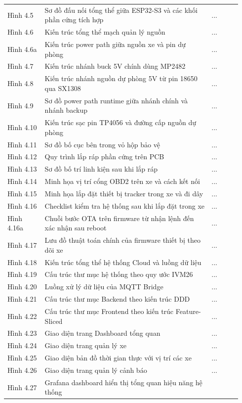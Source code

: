 \documentclass[13pt,a4paper]{extarticle}
\newcommand{\thesislongtableorignewline}{}
\let\thesislongtableorignewline\\
\renewcommand{\\}{\thesislongtableorignewline\hline}%
\let\\\thesislongtableorignewline
\begin{document}
{\begin{longtable}{|C{0.15\linewidth}|L{0.67\linewidth}|C{0.12\linewidth}|}
Hình 4.5 & Sơ đồ đấu nối tổng thể giữa ESP32-S3 và các khối phần cứng
tích hợp & ... \\
Hình 4.6 & Kiến trúc tổng thể mạch quản lý nguồn & ... \\
Hình 4.6a & Kiến trúc power path giữa nguồn xe và pin dự phòng & ... \\
Hình 4.7 & Kiến trúc nhánh buck 5V chính dùng MP2482 & ... \\
Hình 4.8 & Kiến trúc nhánh nguồn dự phòng 5V từ pin 18650 qua SX1308 &
... \\
Hình 4.9 & Sơ đồ power path runtime giữa nhánh chính và nhánh backup &
... \\
Hình 4.10 & Kiến trúc sạc pin TP4056 và đường cấp nguồn dự phòng &
... \\
Hình 4.11 & Sơ đồ bố cục bên trong vỏ hộp bảo vệ & ... \\
Hình 4.12 & Quy trình lắp ráp phần cứng trên PCB & ... \\
Hình 4.13 & Sơ đồ bố trí linh kiện sau khi lắp ráp & ... \\
Hình 4.14 & Minh họa vị trí cổng OBD2 trên xe và cách kết nối & ... \\
Hình 4.15 & Minh họa lắp đặt thiết bị tracker trong xe và đi dây &
... \\
Hình 4.16 & Checklist kiểm tra hệ thống sau khi lắp đặt trong xe &
... \\
Hình 4.16a & Chuỗi bước OTA trên firmware từ nhận lệnh đến xác nhận sau
reboot & ... \\
Hình 4.17 & Lưu đồ thuật toán chính của firmware thiết bị theo dõi xe &
... \\
Hình 4.18 & Kiến trúc tổng thể hệ thống Cloud và luồng dữ liệu & ... \\
Hình 4.19 & Cấu trúc thư mục hệ thống theo quy ước IVM26 & ... \\
Hình 4.20 & Luồng xử lý dữ liệu của MQTT Bridge & ... \\
Hình 4.21 & Cấu trúc thư mục Backend theo kiến trúc DDD & ... \\
Hình 4.22 & Cấu trúc thư mục Frontend theo kiến trúc Feature-Sliced &
... \\
Hình 4.23 & Giao diện trang Dashboard tổng quan & ... \\
Hình 4.24 & Giao diện trang quản lý xe & ... \\
Hình 4.25 & Giao diện bản đồ thời gian thực với vị trí các xe & ... \\
Hình 4.26 & Giao diện trang quản lý cảnh báo & ... \\
Hình 4.27 & Grafana dashboard hiển thị tổng quan hiệu năng hệ thống &

\end{longtable}}
\end{document}
